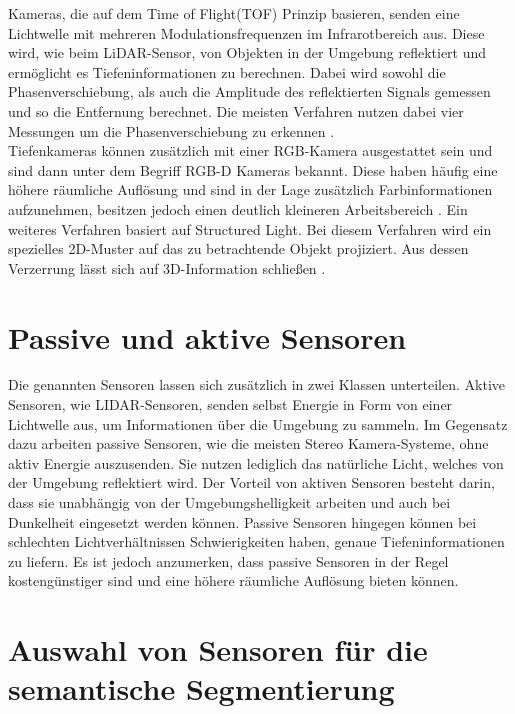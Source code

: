 Kameras, die auf dem Time of Flight(TOF) Prinzip basieren, senden eine
Lichtwelle mit mehreren Modulationsfrequenzen im Infrarotbereich aus. Diese
wird, wie beim LiDAR-Sensor, von Objekten in der Umgebung reflektiert und
ermöglicht es Tiefeninformationen zu berechnen. Dabei wird sowohl die
Phasenverschiebung, als auch die Amplitude des reflektierten Signals gemessen
und so die Entfernung berechnet. Die meisten Verfahren nutzen dabei vier
Messungen um die Phasenverschiebung zu erkennen \cite{7035807,7025195}.
\\Tiefenkameras können zusätzlich mit einer RGB-Kamera ausgestattet sein und sind dann unter
dem Begriff RGB-D Kameras bekannt. Diese haben häufig eine höhere räumliche
Auflösung und sind in der Lage zusätzlich Farbinformationen aufzunehmen,
besitzen jedoch einen deutlich kleineren Arbeitsbereich \cite{9262651}. Ein
weiteres Verfahren basiert auf Structured Light. Bei diesem Verfahren wird ein
spezielles 2D-Muster auf das zu betrachtende Objekt projiziert. Aus dessen
Verzerrung lässt sich auf 3D-Information schließen \cite{7992709}.

\section{Passive und aktive Sensoren}
Die genannten Sensoren lassen sich zusätzlich in zwei Klassen unterteilen.
Aktive Sensoren, wie LIDAR-Sensoren, senden selbst Energie in Form von einer
Lichtwelle aus, um Informationen über die Umgebung zu sammeln. Im Gegensatz
dazu arbeiten passive Sensoren, wie die meisten Stereo Kamera-Systeme, ohne
aktiv Energie auszusenden. Sie nutzen lediglich das natürliche Licht, welches
von der Umgebung reflektiert wird. Der Vorteil von aktiven Sensoren besteht
darin, dass sie unabhängig von der Umgebungshelligkeit arbeiten und auch bei
Dunkelheit eingesetzt werden können. Passive Sensoren hingegen können bei
schlechten Lichtverhältnissen Schwierigkeiten haben, genaue Tiefeninformationen
zu liefern. Es ist jedoch anzumerken, dass passive Sensoren in der Regel
kostengünstiger sind und eine höhere räumliche Auflösung bieten können.
\cite{20222324}

\section{Auswahl von Sensoren für die semantische Segmentierung}


